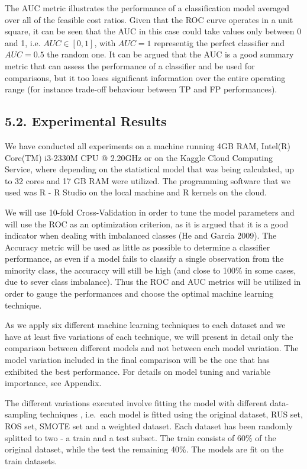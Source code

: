 \documentclass[12pt,]{article}
\begin{document}
The AUC metric illustrates the performance of a classification model
averaged over all of the feasible cost ratios. Given that the ROC curve
operates in a unit square, it can be seen that the AUC in this case
could take values only between 0 and 1, i.e. \(AUC \in [0,1]\), with
\(AUC=1\) representig the perfect classifier and \(AUC=0.5\) the random
one. It can be argued that the AUC is a good summary metric that can
assess the performance of a classifier and be used for comparisons, but
it too loses significant information over the entire operating range
(for instance trade-off behaviour between TP and FP performances).

\hypertarget{experimental-results}{%
\subsection{5.2. Experimental Results}\label{experimental-results}}

We have conducted all experiments on a machine running 4GB RAM, Intel(R)
Core(TM) i3-2330M CPU @ 2.20GHz or on the Kaggle Cloud Computing
Service, where depending on the statistical model that was being
calculated, up to 32 cores and 17 GB RAM were utilized. The programming
software that we used was R - R Studio on the local machine and R
kernels on the cloud.

We will use 10-fold Cross-Validation in order to tune the model
parameters and will use the ROC as an optimization criterion, as it is
argued that it is a good indicator when dealing with imbalanced classes
(He and Garcia 2009). The Accuracy metric will be used as little as
possible to determine a classifier performance, as even if a model fails
to classify a single observation from the minority class, the accuraccy
will still be high (and close to 100\% in some cases, due to sever class
imbalance). Thus the ROC and AUC metrics will be utilized in order to
gauge the performances and choose the optimal machine learning
technique.

As we apply six different machine learning techniques to each dataset
and we have at least five variations of each technique, we will present
in detail only the comparison between different models and not between
each model variation. The model variation included in the final
comparison will be the one that has exhibited the best performance. For
details on model tuning and variable importance, see Appendix.

The different variations executed involve fitting the model with
different data-sampling techniques , i.e.~each model is fitted using the
original dataset, RUS set, ROS set, SMOTE set and a weighted dataset.
Each dataset has been randomly splitted to two - a train and a test
subset. The train consists of 60\% of the original dataset, while the
test the remaining 40\%. The models are fit on the train datasets.
\end{document}
